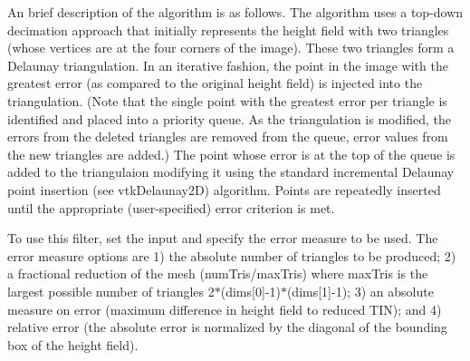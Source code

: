 An brief description of the algorithm is as follows. The algorithm uses a top-\/down decimation approach that initially represents the height field with two triangles (whose vertices are at the four corners of the image). These two triangles form a Delaunay triangulation. In an iterative fashion, the point in the image with the greatest error (as compared to the original height field) is injected into the triangulation. (Note that the single point with the greatest error per triangle is identified and placed into a priority queue. As the triangulation is modified, the errors from the deleted triangles are removed from the queue, error values from the new triangles are added.) The point whose error is at the top of the queue is added to the triangulaion modifying it using the standard incremental Delaunay point insertion (see vtk\-Delaunay2\-D) algorithm. Points are repeatedly inserted until the appropriate (user-\/specified) error criterion is met.

To use this filter, set the input and specify the error measure to be used. The error measure options are 1) the absolute number of triangles to be produced; 2) a fractional reduction of the mesh (num\-Tris/max\-Tris) where max\-Tris is the largest possible number of triangles 2$\ast$(dims\mbox{[}0\mbox{]}-\/1)$\ast$(dims\mbox{[}1\mbox{]}-\/1); 3) an absolute measure on error (maximum difference in height field to reduced T\-I\-N); and 4) relative error (the absolute error is normalized by the diagonal of the bounding box of the height field).


